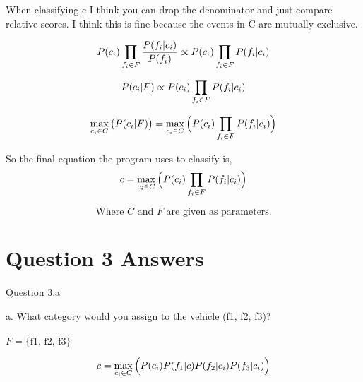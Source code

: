 \documentclass{article}
\begin{document}
%
%

When classifying c I think you can drop the denominator and just compare relative scores. I think this is fine because the events in C are mutually exclusive.

\begin{equation}
	\nonumber
	P(c_i) \prod\limits_{f_i \in F} \frac{ P(f_i|c_i)}{P(f_i)}
	\propto
	P(c_i) \prod\limits_{f_i \in F} P(f_i|c_i)
\end{equation}

\begin{equation}
	\nonumber
	P(c_i|F)
	\propto
	P(c_i) \prod\limits_{f_i \in F} P(f_i|c_i)
\end{equation}



\begin{equation}
	\nonumber
 	\max_{c_i \in C} \big( P(c_i|F) \big)
	=
	\max_{c_i \in C} \Big( P(c_i) \prod\limits_{f_i \in F} P(f_i|c_i) \Big)
\end{equation}

%
%

So the final equation the program uses to classify is,
\begin{equation}
	\nonumber
 	c
	=
	\max_{c_i \in C} \Big( P(c_i) \prod\limits_{f_i \in F} P(f_i|c_i) \Big)
\end{equation}

\begin{equation}
	\nonumber
	\text{Where $C$ and $F$ are given as parameters.}
\end{equation}

%
%

\section{Question 3 Answers}

\begin{center} Question 3.a \end{center}

a. 	What category would you assign to the vehicle (f1, f2, f3)? \\ \\

$F = \{ \text{f1, f2, f3} \}$

\begin{equation}
	\nonumber
 	c
	=
	\max_{c_i \in C} 
	\Big(
	P(c_i) P(f_1|c)P(f_2|c_i)P(f_3|c_i)
	\Big)
\end{equation}
\end{document}
